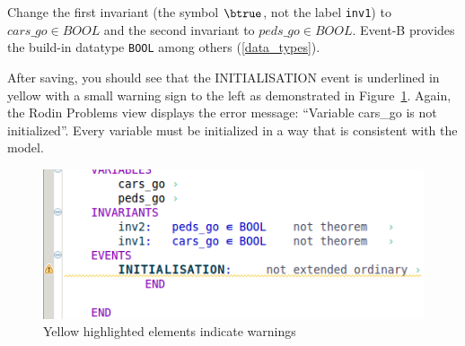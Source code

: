 Change the first invariant (the symbol $\btrue$, not the label \texttt{inv1}) to $cars\_go \in  BOOL$ and the second invariant to $peds\_go \in  BOOL$.
Event-B provides the build-in datatype \texttt{BOOL} among others (\ref{data_types}).



After saving, you should see that the \textsf{INITIALISATION} event is underlined in yellow with a small warning sign to the left as demonstrated in Figure~\ref{fig_tut_03_warning}. Again, the \textsf{Rodin Problems} view displays the error message: ``Variable cars\_go is not initialized''. Every variable must be initialized in a way that is consistent with the model.

\begin{figure}[!ht]
\begin{center}
	\includegraphics[]{img/tutorial/tut_03_yellow_neweditor.png}
	\caption{Yellow highlighted elements indicate warnings}
	\label{fig_tut_03_warning}
\end{center}
\end{figure}

